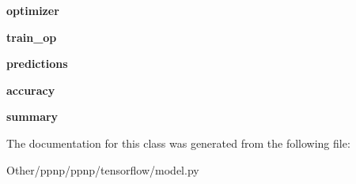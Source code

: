 \begin{DoxyCompactItemize}
{\bfseries optimizer}
\item 
\mbox{\label{classppnp_1_1tensorflow_1_1model_1_1Model_a74044018640513b737f215dea28c30db}} 
{\bfseries train\+\_\+op}
\item 
\mbox{\label{classppnp_1_1tensorflow_1_1model_1_1Model_aeb5df2c0678af159d1c42596fd9392f1}} 
{\bfseries predictions}
\item 
\mbox{\label{classppnp_1_1tensorflow_1_1model_1_1Model_a0a0a9cef5c7052603ca3d0e6931829cd}} 
{\bfseries accuracy}
\item 
\mbox{\label{classppnp_1_1tensorflow_1_1model_1_1Model_a9741f13e2ca390d1e259618a1351b706}} 
{\bfseries summary}
\end{DoxyCompactItemize}


The documentation for this class was generated from the following file\+:\begin{DoxyCompactItemize}
\item 
Other/ppnp/ppnp/tensorflow/model.\+py\end{DoxyCompactItemize}
